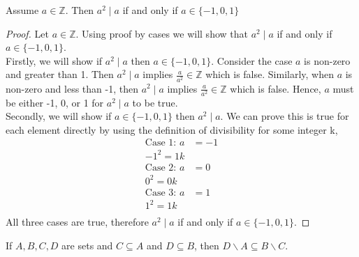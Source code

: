 \documentclass[12pt]{article}
\newenvironment{theorem}[2][Theorem]{\begin{trivlist}
\item[\hskip \labelsep {\bfseries #1}\hskip \labelsep {\bfseries #2.}]}{\end{trivlist}}
\begin{document}
\pagebreak

\begin{theorem}{5}
	Assume $a \in \mathbb{Z}$. Then $a^2 \mid a$ if and only if $a \in\{-1,0,1\}$
\end{theorem}
\begin{proof}
	Let $a \in \mathbb{Z}$. Using proof by cases we will show that $a^2 \mid a$ if and only if $a \in\{-1,0,1\}$.\\

	Firstly, we will show if $a^2 \mid a$ then $a \in\{-1,0,1\}$. Consider the case $a$ is non-zero and greater than 1. 
	Then $a^2 \mid a$ implies $\frac{a}{a^2} \in \mathbb{Z}$ which is false. Similarly, when $a$ is non-zero and less than -1, 
	then $a^2 \mid a$ implies $\frac{a}{a^2} \in \mathbb{Z}$ which is false. Hence, $a$ must be either -1, 0, or 1 for $a^2 \mid a$ to be true.\\

	Secondly, we will show if $a \in\{-1,0,1\}$ then $a^2 \mid a$. We can prove this is true for each element directly by using the definition of divisibility for
	some integer k,
	\begin{align*}
		\text{Case 1: } a &= -1\\
		{-1}^2 = 1k \\
		\text{Case 2: } a &= 0\\
		{0}^2 = 0k\\
		\text{Case 3: } a &= 1\\
		{1}^2 = 1k\\
	\end{align*}
	All three cases are true, therefore $a^2 \mid a$ if and only if $a \in\{-1,0,1\}$.

\end{proof}
\begin{theorem}{6}
If $A, B, C, D$ are sets and $C \subseteq A$ and $D \subseteq B$, then $D \backslash A \subseteq B \backslash C$.
\end{theorem}
\end{document}
